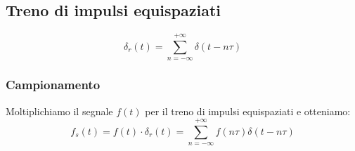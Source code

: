 \documentclass[12pt, a4paper]{report}
\begin{document}
\subsection{Treno di impulsi equispaziati}
\begin{equation*}
    \delta_{r}(t) = \sum_{n=-\infty}^{+\infty} \delta(t-n\tau)
\end{equation*}
\subsubsection{Campionamento}
Moltiplichiamo il segnale $f(t)$ per il treno di impulsi equispaziati e otteniamo:
\begin{equation*}
    f_{s}(t) = f(t) \cdot \delta_{r}(t) = \sum_{n=-\infty}^{+\infty} f(n\tau) \delta(t-n\tau)
\end{equation*}
\end{document}
